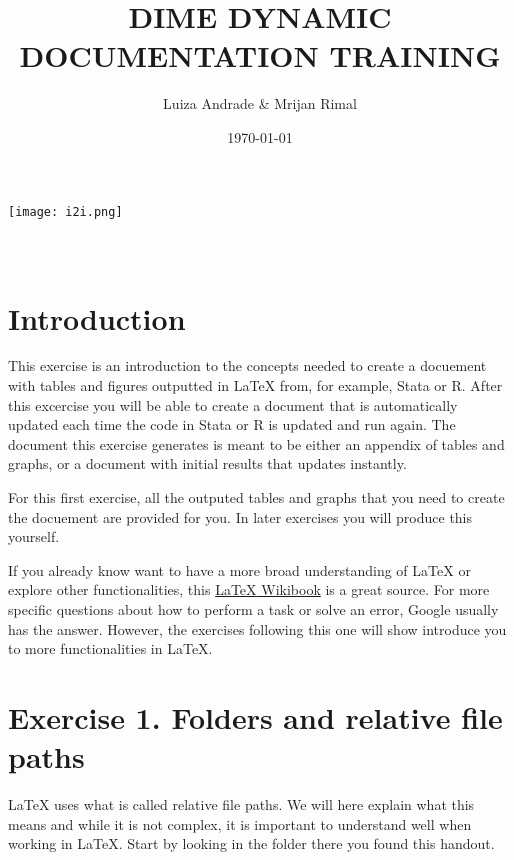 \documentclass[12pts]{report}
\title{DIME DYNAMIC DOCUMENTATION TRAINING }
\author{Luiza Andrade \& Mrijan Rimal}
\date{\today}
\begin{document}
	

\makeatletter
\begin{titlepage}
	\begin{center}
		\texttt{[image: i2i.png]}\\[10ex]
		{\LARGE \bfseries  \@title }\\[2ex] 
		{\Large  \@author}\\[20ex] 
		{\large \@date}
	\end{center}
\end{titlepage}
\makeatother

\section*{Introduction}
This exercise is an introduction to the concepts needed to create a docuement with tables and figures outputted in {\LaTeX} from, for example, Stata or R. After this excercise you will be able to create a document that is automatically updated each time the code in Stata or R is updated and run again. The document this exercise generates is meant to be either an appendix of tables and graphs, or a document with initial results that updates instantly.

For this first exercise, all the outputed tables and graphs that you need to create the docuement are provided for you. In later exercises you will produce this yourself.

If you already know want to have a more broad understanding of {\LaTeX} or explore other functionalities, this \href{https://en.wikibooks.org/wiki/LaTeX
}{{\LaTeX} Wikibook} is a great source. For more specific questions about how to perform a task or solve an error, Google usually has the answer. However, the exercises following this one will show introduce you to more functionalities in {\LaTeX}.

\section*{Exercise 1. Folders and relative file paths}
{\LaTeX} uses what is called relative file paths. We will here explain what this means and while it is not complex, it is important to understand well when working in {\LaTeX}. Start by looking in the folder there you found this handout. 
\end{document}
